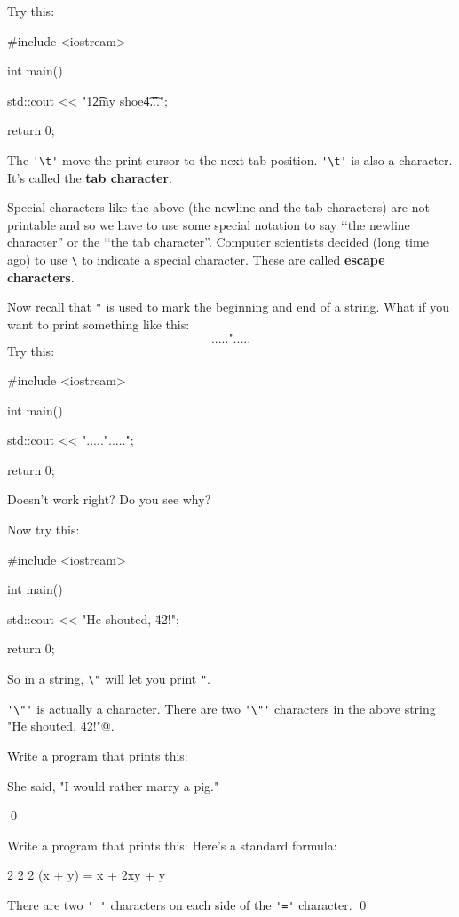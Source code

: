 Try this:
\begin{console}
#include <iostream>

int main()
{
    std::cout << "1\t2\tbuckle my shoe\t4\t...\n";

    return 0;
}
\end{console}

The \verb!'\t'! move the print cursor to the next tab position. 
\verb!'\t'! is also a character. 
It's called the \textbf{tab character}.

Special characters like the above (the newline and the tab characters) are not printable and so we have to use some special notation to say 
\lq\lq the newline character'' or the 
\lq\lq the tab character''. 
Computer scientists decided (long time ago) to use 
\verb!\! to indicate a special character. 
These are called \textbf{escape characters}.

Now recall that \verb!"! is used to mark the beginning and end of a string. What if you want to print something like this:
\[
	\texttt{.....".....}
\]
Try this:
\begin{console}
#include <iostream>

int main()
{
    std::cout << ".....".....";

    return 0;
}
\end{console}
Doesn't work right? Do you see why?

Now try this:
\begin{console}
#include <iostream>

int main()
{
    std::cout << "He shouted, \"42!\"\n";

    return 0;
}
\end{console}

So in a string, \verb!\"! will let you print \verb!"!. 

\verb!'\"'! is actually a character. 
There are two \verb!'\"'! characters in the above string  
\verb@"He shouted, \"42!\"\n"@.


\begin{ex}
Write a program that prints this:
\begin{console}
She said, "I would rather marry a pig."
\end{console}
\qed
\end{ex}

\begin{ex}
Write a program that prints this:
Here's a standard formula:
\begin{console}
       2      2          2
(x + y)   =  x  + 2xy + y
\end{console}
There are two \verb!' '! characters on each side of the 
\verb!'='! character.
\qed
\end{ex}


